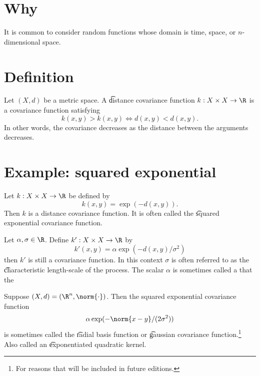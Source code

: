 

\section*{Why}

It is common to consider random functions whose domain is time, space, or $n$-dimensional space.

\section*{Definition}

Let $(X, d)$ be a metric space. A \t{distance covariance function} $k: X \times X \to \R $ is a covariance function satisfying
  \[
k(x, y) > k(x, y) \iff d(x, y) < d(x, y).
  \]
In other words, the covariance decreases as the distance between the arguments decreases.

\section*{Example: squared exponential}

Let $k: X \times X \to \R $ be defined by
    \[
k(x, y) = \exp(-d(x, y)).
    \]
Then $k$ is a distance covariance function.
It is often called the \t{squared exponential covariance function}.

Let $\alpha , \sigma  \in \R $.
Define $k': X \times X \to \R $ by
    \[
k'(x, y) = \alpha \exp(-d(x, y)/\sigma ^2)
    \]
then $k'$ is still a covariance function.
In this context $\sigma $ is often referred to as the \t{characteristic length-scale} of the process.
The scalar $\alpha $ is sometimes called a  that  the 

Suppose $(X, d) = (\R ^n, \norm{\cdot })$.
Then the squared exponential covariance function
    \[
\alpha \exp(-\norm{x - y}/(2\sigma ^2))
    \]
is sometimes called the \t{radial basis function} or \t{gaussian covariance function}.\footnote{For reasons that will be included in future editions.}
Also called an \t{exponentiated quadratic kernel}.
